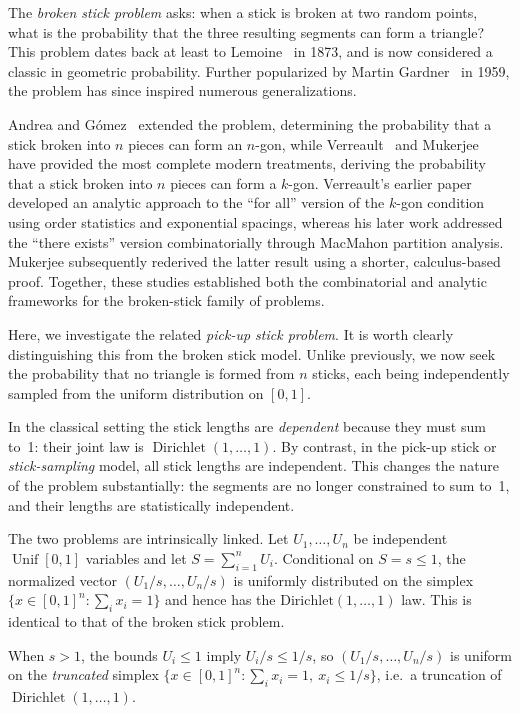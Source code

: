 \documentclass{amsart}
\begin{document}
The \emph{broken stick problem} asks: when a stick is broken at two random points, what is the probability that the three resulting segments can form a triangle?
This problem dates back at least to Lemoine~\cite{lemoine} in 1873, and is now considered a classic in geometric probability. Further popularized by Martin Gardner~\cite{gardner} in 1959, the problem has since inspired numerous generalizations. 

Andrea and G\'{o}mez~\cite{andrea} extended the problem, determining the probability that a stick broken into $n$ pieces can form an $n$-gon, while Verreault~\cite{verreault2022a, verreault2022b} and Mukerjee~\cite{mukerjee2024} have provided the most complete modern treatments, deriving the probability that a stick broken into $n$ pieces can form a $k$-gon. Verreault's earlier paper \cite{verreault2022a} developed an analytic approach to the ``for all'' version of the $k$-gon condition using order statistics and exponential spacings, whereas his later work addressed the ``there exists'' version combinatorially through MacMahon partition analysis. Mukerjee subsequently rederived the latter result using a shorter, calculus-based proof. Together, these studies established both the combinatorial and analytic frameworks for the broken-stick family of problems.

Here, we investigate the related \emph{pick-up stick problem}. It is worth clearly distinguishing this from the broken stick model. Unlike previously, we now seek the probability that no triangle is formed from $n$ sticks, each being independently sampled from the uniform distribution on $[0, 1]$.

In the classical setting the stick lengths are \emph{dependent} because they must sum to~1: their joint law is $\operatorname{Dirichlet}(1,\dots,1)$. By contrast, in the pick-up stick or \emph{stick-sampling} model, all stick lengths are independent. This changes the nature of the problem substantially: the segments are no longer constrained to sum to~1, and their lengths are statistically independent.

The two problems are intrinsically linked. Let $U_1,\dots,U_n$ be independent $\operatorname{Unif}[0,1]$ variables and let $S=\sum_{i=1}^n U_i$. Conditional on $S=s\le 1$, the normalized vector $(U_1/s,\dots,U_n/s)$ is uniformly distributed on the simplex $\{x\in[0,1]^n:\sum_i x_i=1\}$ and hence has the $\mathrm{Dirichlet}(1,\dots,1)$ law. This is identical to that of the broken stick problem.

When $s>1$, the bounds $U_i\le 1$ imply $U_i/s\le 1/s$, so $(U_1/s,\dots,U_n/s)$ is uniform on the \emph{truncated} simplex $\{x\in[0,1]^n:\sum_i x_i=1,\ x_i\le 1/s\}$, i.e.\ a truncation of $\operatorname{Dirichlet}(1,\dots,1)$. 
\end{document}
